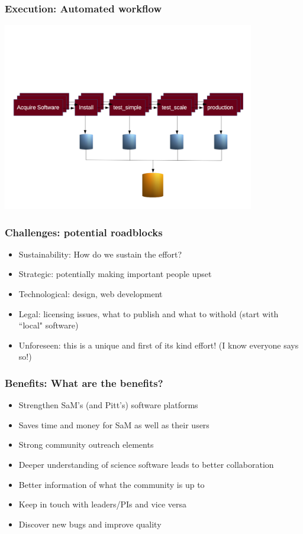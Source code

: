 \documentclass[hyperref={pdfpagelabels=false},12pt]{beamer}
\begin{document}
\begin{frame}
\frametitle{Execution: Automated workflow}
\begin{center}
\includegraphics[width=11cm]{workflow}
\end{center}
\end{frame}

\begin{frame}
\frametitle{Challenges: potential roadblocks}
\begin{itemize}
\itemsep1em
\item
 Sustainability: How do we sustain the effort?
\item 
Strategic: potentially making important people upset
\item
Technological: design, web development
\item
Legal: licensing issues, what to publish and what to withold (start with ``local" software)
\item
Unforeseen: this is a unique and first of its kind effort! (I know everyone says so!)
\end{itemize}
\end{frame}

\begin{frame}
\frametitle{Benefits: What are the benefits?}
\begin{itemize}
\itemsep1em
\item Strengthen SaM's (and Pitt's) software platforms
\item
Saves time and money for SaM as well as their users
\item
Strong community outreach elements
\item
Deeper understanding of science software leads to better collaboration
\item 
Better information of what the community is up to
\item
Keep in touch with leaders/PIs and vice versa
\item
Discover new bugs and improve quality
\end{itemize}
\end{frame}
\end{document}
